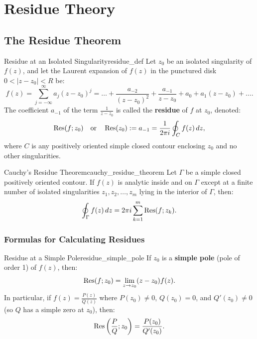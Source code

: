 \chapter{Residue Theory}

\section{The Residue Theorem}

\begin{definition}{Residue at an Isolated Singularity}{residue_def}
Let $z_0$ be an isolated singularity of $f(z)$, and let the Laurent expansion of $f(z)$ in the punctured disk $0 < |z - z_0| < R$ be:
\begin{equation}
f(z) = \sum_{j=-\infty}^\infty a_j (z - z_0)^j = \dots + \frac{a_{-2}}{(z - z_0)^2} + \frac{a_{-1}}{z - z_0} + a_0 + a_1(z - z_0) + \dots.
\end{equation}
The coefficient $a_{-1}$ of the term $\frac{1}{z - z_0}$ is called the \textbf{residue} of $f$ at $z_0$, denoted:
\begin{equation}
\operatorname{Res}(f; z_0) \quad \text{or} \quad \operatorname{Res}(z_0) := a_{-1} = \frac{1}{2\pi i} \oint_C f(z)\, dz,
\end{equation}
where $C$ is any positively oriented simple closed contour enclosing $z_0$ and no other singularities.
\end{definition}

\begin{theorem}{Cauchy's Residue Theorem}{cauchy_residue_theorem}
Let $\Gamma$ be a simple closed positively oriented contour. If $f(z)$ is analytic inside and on $\Gamma$ except at a finite number of isolated singularities $z_1, z_2, \dots, z_m$ lying in the interior of $\Gamma$, then:
\begin{equation}
\oint_\Gamma f(z)\, dz = 2\pi i \sum_{k=1}^m \operatorname{Res}(f; z_k).
\end{equation}
\end{theorem}

\subsection{Formulas for Calculating Residues}

\begin{proposition}{Residue at a Simple Pole}{residue_simple_pole}
If $z_0$ is a \textbf{simple pole} (pole of order 1) of $f(z)$, then:
\begin{equation}
\operatorname{Res}(f; z_0) = \lim_{z \to z_0} (z - z_0) f(z).
\end{equation}
In particular, if $f(z) = \frac{P(z)}{Q(z)}$ where $P(z_0) \neq 0$, $Q(z_0) = 0$, and $Q'(z_0) \neq 0$ (so $Q$ has a simple zero at $z_0$), then:
\begin{equation}
\operatorname{Res}\left(\frac{P}{Q}; z_0\right) = \frac{P(z_0)}{Q'(z_0)}.
\end{equation}
\end{proposition}


